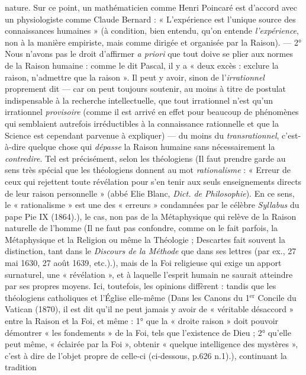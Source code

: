 nature. Sur ce point, un mathématicien comme Henri Poincaré est
d'accord avec un physiologiste comme Claude Bernard : « L’expérience est l’unique source des connaissances humaines » (à condition,
bien entendu, qu’on entende {\it l'expérience}, non à la manière empiriste,
mais comme dirigée et organisée par la Raison). — 2° Nous n'avons
pas le droit d’affirmer {\it a priori} que tout doive se plier aux normes de
la Raison humaine : comme le dit Pascal, il y a « deux excès : exclure
la raison, n’admettre que la raison ». Il peut y avoir, sinon de l’{\it irrationnel} proprement dit — car on peut toujours soutenir, au moins à
titre de postulat indispensable à la recherche intellectuelle, que tout
irrationnel n’est qu’un irrationnel {\it provisoire} (comme il est arrivé en
effet pour beaucoup de phénomènes qui semblaient autrefois irréductibles à la connaissance rationnelle et que la Science est cependant
parvenue à expliquer) — du moins du {\it transrationnel}, c’est-à-dire
quelque chose qui {\it dépasse} la Raison humaine sans nécessairement la
{\it contredire}. Tel est précisément, selon les théologiens {\scriptsize (Il faut prendre garde au sens très spécial que les théologiens donnent au mot
{\it rationalisme} : « Erreur de ceux qui rejettent toute révélation pour s’en tenir aux seuls
enseignements directs de leur raison personnelle » (abbé Elie Blanc, {\it Dict. de Philosophie}).
En ce sens, le « rationalisme » est une des « erreurs » condamnées par le célèbre {\it Syllabus}
du pape Pie IX (1864).)}, le cas, non pas
de la Métaphysique qui relève de la Raison naturelle de l’homme {\scriptsize (Il ne faut pas confondre, comme on le fait parfois, la Métaphysique et la Religion
ou même la Théologie ; Descartes fait souvent la distinction, tant dans le {\it Discours de
la Méthode} que dans ses lettres (par ex., 27 mai 1630, 27 août 1639, etc.).)},
mais de la Foi religieuse qui exige un apport surnaturel, une « révélation », et à laquelle l'esprit humain ne saurait atteindre par ses
propres moyens. Ici, toutefois, les opinions diffèrent : tandis que les
théologiens catholiques et l’Église elle-même {\scriptsize (Dans les Canons du 1$^\text{er}$ Concile du Vatican (1870), il est dit qu'il ne peut jamais y
avoir de « véritable désaccord » entre la Raison et la Foi, et même : 1° que la « droite
raison » doit pouvoir démontrer « les fondements » de la Foi, tels que l'existence de Dieu ;
2° qu’elle peut même, « éclairée par la Foi », obtenir « quelque intelligence des mystères »,
c'est à dire de l'objet propre de celle-ci (ci-dessous, p.626 n.1).)}, continuant la tradition
